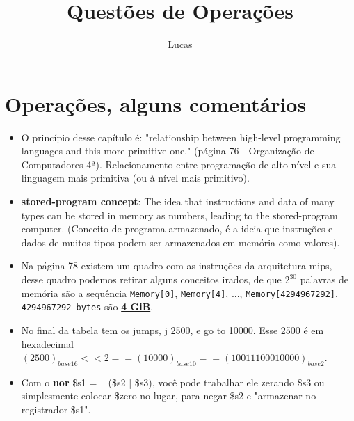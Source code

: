 \documentclass{article}
\author{Lucas}
\title{Questões de Operações}
\begin{document}
\maketitle

\section{Operações, alguns comentários}

\begin{itemize}
\item O princípio desse capítulo é: "relationship between high-level programming
languages and this more primitive one." (página 76 - Organização de Computadores
4ª). Relacionamento entre programação de alto nível e sua linguagem mais
primitiva (ou à nível mais primitivo).

\item \textbf{stored-program concept}: The idea that instructions and data of
many types can be stored in memory as numbers, leading to the stored-program
computer. (Conceito de programa-armazenado, é a ideia que instruções e dados de
muitos tipos podem ser armazenados em memória como valores).

\item Na página 78 existem um quadro com as instruções da arquitetura mips,
desse quadro podemos retirar alguns conceitos irados, de que $2^{30}$ palavras
de memória são a sequência \verb|Memory[0]|, \verb|Memory[4]|, ...,
\verb|Memory[4294967292]|. \verb|4294967292 bytes| são \textbf{\underline{4
GiB}}.

\item No final da tabela tem os jumps, j 2500, e go to 10000. Esse 2500 é em
hexadecimal $(2500)_{base16} << 2 == (10000)_{base10} ==
(10011100010000)_{base2}$.

\item Com o \textbf{nor} \$s1 = ~ (\$s2 | \$s3), você pode trabalhar ele
zerando \$s3 ou simplesmente colocar \$zero no lugar, para negar \$s2 e
"armazenar no registrador \$s1".


\end{itemize}
\end{document}
